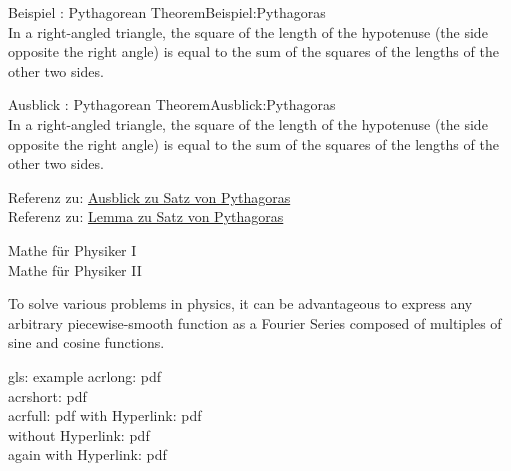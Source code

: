 	\begin{example}{Beispiel \currentboxsection: Pythagorean Theorem}{Beispiel:Pythagoras} \label{exa:Pythagoras} \\
		In a right-angled triangle, the square of the length of the hypotenuse (the side opposite the right angle) is equal to the sum of the squares of the lengths of the other two sides.
	\end{example}
	
	\begin{excursion}{Ausblick \currentboxsection: Pythagorean Theorem}{Ausblick:Pythagoras} \label{exc:Pythagoras} \\
		In a right-angled triangle, the square of the length of the hypotenuse (the side opposite the right angle) is equal to the sum of the squares of the lengths of the other two sides.
	\end{excursion}
	
		Referenz zu: \hyperref[exc:Pythagoras]{Ausblick zu Satz von Pythagoras} \\
		Referenz zu: \hyperref[lemma:Pythagoras]{Lemma zu Satz von Pythagoras}
		
		Mathe für Physiker I  \\			%
		Mathe für Physiker II 				%
		
		To solve various problems in physics, it can be advantageous to express any arbitrary piecewise-smooth function as a Fourier Series  composed of multiples of sine and cosine functions.
		
		gls: \gls{example}
		\bigbreak \noindent
		acrlong: \acrlong{pdf} \\											%
		acrshort: \acrshort{pdf} \\											%
		acrfull: \acrfull{pdf} 												%
		\bigbreak \noindent
		with Hyperlink: \acrshort{pdf}\\									%
		without Hyperlink: {\glsdisablehyper\acrshort{pdf}} \\				%
		again with Hyperlink: \acrshort{pdf}								%
		
